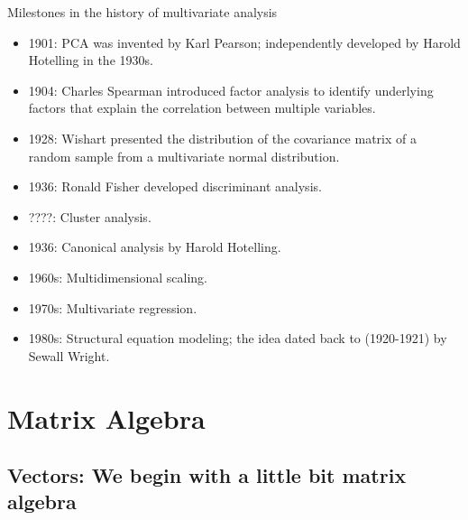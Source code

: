\documentclass[
  ignorenonframetext,
]{beamer}
\providecommand{\tightlist}{%
  \setlength{\itemsep}{0pt}\setlength{\parskip}{0pt}}
\begin{document}
\begin{frame}{Milestones in the history of multivariate analysis}
\protect\hypertarget{milestones-in-the-history-of-multivariate-analysis}{}
\begin{itemize}
\tightlist
\item
  1901: PCA was invented by Karl Pearson; independently developed by
  Harold Hotelling in the 1930s.
\item
  1904: Charles Spearman introduced factor analysis to identify
  underlying factors that explain the correlation between multiple
  variables.
\item
  1928: Wishart presented the distribution of the covariance matrix of a
  random sample from a multivariate normal distribution.
\item
  1936: Ronald Fisher developed discriminant analysis.
\item
  ????: Cluster analysis.
\item
  1936: Canonical analysis by Harold Hotelling.
\item
  1960s: Multidimensional scaling.
\item
  1970s: Multivariate regression.
\item
  1980s: Structural equation modeling; the idea dated back to
  (1920-1921) by Sewall Wright.
\end{itemize}
\end{frame}

\hypertarget{matrix-algebra}{%
\section{Matrix Algebra}\label{matrix-algebra}}

\hypertarget{vectors-we-begin-with-a-little-bit-matrix-algebra}{%
\subsection{Vectors: We begin with a little bit matrix
algebra}\label{vectors-we-begin-with-a-little-bit-matrix-algebra}}
\end{document}
